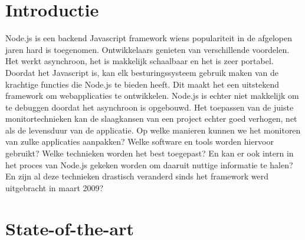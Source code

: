 
\section{Introductie} %
\label{sec:introductie}

Node.js is een backend Javascript framework wiens populariteit in de afgelopen jaren hard is toegenomen. Ontwikkelaars genieten van verschillende voordelen. Het werkt asynchroon, het is makkelijk schaalbaar en het is zeer portabel. Doordat het Javascript is, kan elk besturingssysteem gebruik maken van de krachtige functies die Node.js te bieden heeft. Dit maakt het een uitstekend framework om webapplicaties te ontwikkelen. Node.js is echter niet makkelijk om te debuggen doordat het asynchroon is opgebouwd. Het toepassen van de juiste monitortechnieken kan de slaagkansen van een project echter goed verhogen, net als de levensduur van de applicatie. Op welke manieren kunnen we het monitoren van zulke applicaties aanpakken? Welke software en tools worden hiervoor gebruikt? Welke technieken worden het best toegepast? En kan er ook intern in het proces van Node.js gekeken worden om daaruit nuttige informatie te halen? En zijn al deze technieken drastisch veranderd sinds het framework werd uitgebracht in maart 2009? 


\section{State-of-the-art}
\label{sec:state-of-the-art}

